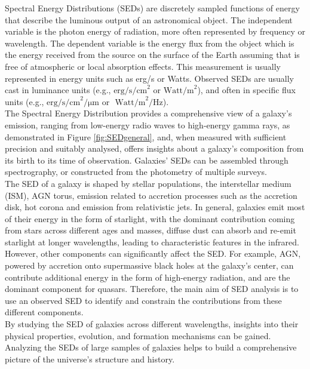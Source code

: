 Spectral Energy Distributions (SEDs) are discretely sampled functions of energy that describe the luminous output of an astronomical object. The independent variable is the photon energy of radiation, more often represented by frequency or wavelength. The dependent variable is the energy flux from the object which is the energy received from the source on the surface of the Earth assuming that is free of atmospheric or local absorption effects. This measurement is usually represented in energy units such as erg/s or Watts. Observed SEDs are usually cast in luminance units (e.g., $\mbox{erg/s/cm}^2$ or $\mbox{Watt/m}^2$), and often in specific flux units (e.g., $\mbox{erg/s/cm}^2\mbox{/μm}$ or $\mbox{ Watt/m}^2\mbox{/Hz}$).\\
The Spectral Energy Distribution provides a comprehensive view of a galaxy's emission, ranging from low-energy radio waves to high-energy gamma rays, as demonstrated in Figure \ref{fig:SEDgeneral}, and, when measured with sufficient precision and suitably analysed, offers insights about a galaxy’s composition from its birth to its time of observation\cite{Acquaviva2011}.
Galaxies' SEDs can be assembled through spectrography, or constructed from the photometry of multiple surveys\cite{Walcher2011}.\\
The SED of a galaxy is shaped by stellar populations, the interstellar medium (ISM), AGN torus, emission related to accretion processes such as the accretion disk, hot corona and emission from relativistic jets. In general, galaxies emit most of their energy in the form of starlight, with the dominant contribution coming from stars across different ages and masses, diffuse dust can absorb and re-emit starlight at longer wavelengths, leading to characteristic features in the infrared. However, other components can significantly affect the SED. For example, AGN, powered by accretion onto supermassive black holes at the galaxy's center, can contribute additional energy in the form of high-energy radiation, and are the dominant component for quasars. Therefore, the main aim of SED analysis is to use an observed SED to identify and constrain the contributions from these different components.\\
By studying the SED of galaxies across different wavelengths, insights into their physical properties, evolution, and formation mechanisms can be gained. Analyzing the SEDs of large samples of galaxies helps to build a comprehensive picture of the universe's structure and history.


